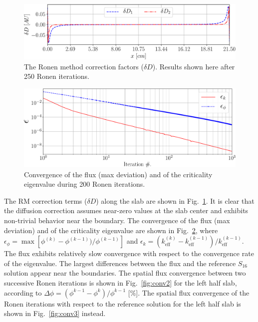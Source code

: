 \begin{figure}[htbp]
	\centering
	\includegraphics[width=0.65\linewidth]{dD_Tomatis2011_400_250it.pdf}
	\caption{The Ronen method correction factors ($\delta D$). Results shown here after 250 Ronen iterations.}
	\label{fig:slab-RM-corr-factor}
\end{figure}



\begin{figure}[htbp]
	\centering
	\includegraphics[width=0.65\linewidth]{epsilon1000.pdf}	
	\caption{Convergence of the flux (max deviation) and of the criticality
		eigenvalue during 200 Ronen iterations.}
	\label{fig:conv}
\end{figure}

The RM correction terms ($\delta D$) along the slab are shown in Fig.~\ref{fig:slab-RM-corr-factor}. It is clear that the diffusion correction assumes near-zero values at the slab center and exhibits non-trivial behavior near the boundary. The convergence of the flux (max deviation) and of the criticality eigenvalue are shown in Fig.~\ref{fig:conv}, where $\epsilon_\phi = \operatorname{max} [\phi^{(k)}-\phi^{(k-1)})/\phi^{(k-1)}]$ and $\epsilon_k = (k_\textrm{eff}^{(k)}-k_\textrm{eff}^{(k-1)})/k_\textrm{eff}^{(k-1)}$. The flux exhibits relatively slow convergence with respect to the convergence rate of the eigenvalue. The largest differences between the flux and the reference $S_{16}$ solution appear near the boundaries. The spatial flux convergence between two successive Ronen iterations is shown in Fig.~\ref{fig:conv2} for the left half slab, according to $\Delta \phi = (\phi^{k-1}-\phi^k)/\phi^{k-1}$ [\%]. The spatial flux convergence of the Ronen iterations with respect to the reference solution for the left half slab is shown in Fig.~\ref{fig:conv3} instead.

